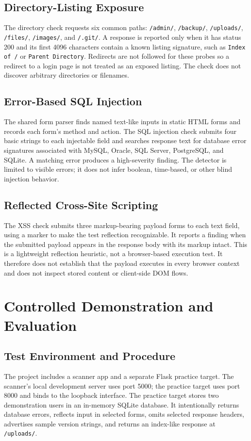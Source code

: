 \documentclass[conference]{IEEEtran}
\begin{document}
\subsection{Directory-Listing Exposure}
The directory check requests six common paths: \texttt{/admin/},
\texttt{/backup/}, \texttt{/uploads/}, \texttt{/files/}, \texttt{/images/},
and \texttt{/.git/}. A response is reported only when it has status 200 and
its first 4096 characters contain a known listing signature, such as
\texttt{Index of /} or \texttt{Parent Directory}. Redirects are not followed
for these probes so a redirect to a login page is not treated as an exposed
listing. The check does not discover arbitrary directories or filenames.

\subsection{Error-Based SQL Injection}
The shared form parser finds named text-like inputs in static HTML forms and
records each form's method and action. The SQL injection check submits four
basic strings to each injectable field and searches response text for database
error signatures associated with MySQL, Oracle, SQL Server, PostgreSQL, and
SQLite. A matching error produces a high-severity finding. The detector is
limited to visible errors; it does not infer boolean, time-based, or other blind
injection behavior.

\subsection{Reflected Cross-Site Scripting}
The XSS check submits three markup-bearing payload forms to each text field,
using a marker to make the test reflection recognizable. It reports a finding
when the submitted payload appears in the response body with its markup intact.
This is a lightweight reflection heuristic, not a browser-based execution
test. It therefore does not establish that the payload executes in every
browser context and does not inspect stored content or client-side DOM flows.

\section{Controlled Demonstration and Evaluation}
\subsection{Test Environment and Procedure}
The project includes a scanner app and a separate Flask practice target. The
scanner's local development server uses port 5000; the practice target uses
port 8000 and binds to the loopback interface. The practice target stores two
demonstration users in an in-memory SQLite database. It intentionally returns
database errors, reflects input in selected forms, omits selected response
headers, advertises sample version strings, and returns an index-like response
at \texttt{/uploads/}.
\end{document}
